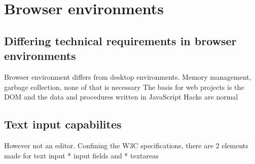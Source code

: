 \chapter{Browser environments}

\section{Differing technical requirements in browser environments}

Browser environment differs from desktop environments. 
Memory management, garbage collection, none of that is necessary
The basis for web projects is the DOM and the data and procedures written in JavaScript
Hacks are normal

\section{Text input capabilites}

However not an editor.
Confining the W3C specifications, there are 2 elements made for text input
 * input fields and
 * textareas